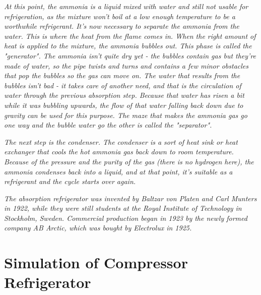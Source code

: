 \emph{At this point, the ammonia is a liquid mixed with water and still not usable for refrigeration, as the mixture won't boil at a low enough temperature to be a worthwhile refrigerant. It's now necessary to separate the ammonia from the water. This is where the heat from the flame comes in. When the right amount of heat is applied to the mixture, the ammonia bubbles out. This phase is called the "generator". The ammonia isn't quite dry yet - the bubbles contain gas but they're made of water, so the pipe twists and turns and contains a few minor obstacles that pop the bubbles so the gas can move on. The water that results from the bubbles isn't bad - it takes care of another need, and that is the circulation of water through the previous absorption step. Because that water has risen a bit while it was bubbling upwards, the flow of that water falling back down due to gravity can be used for this purpose. The maze that makes the ammonia gas go one way and the bubble water go the other is called the "separator".}

\emph{The next step is the condenser. The condenser is a sort of heat sink or heat exchanger that cools the hot ammonia gas back down to room temperature. Because of the pressure and the purity of the gas (there is no hydrogen here), the ammonia condenses back into a liquid, and at that point, it's suitable as a refrigerant and the cycle starts over again.}


\emph{The absorption refrigerator was invented by Baltzar von Platen and Carl Munters in 1922, while they were still students at the Royal Institute of Technology in Stockholm, Sweden. Commercial production began in 1923 by the newly formed company AB Arctic, which was bought by Electrolux in 1925.}



\section{Simulation of Compressor Refrigerator}





